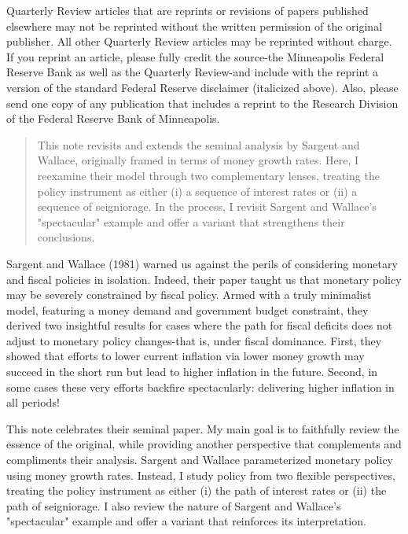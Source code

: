 \documentclass[10pt]{article}
\begin{document}
Quarterly Review articles that are reprints or revisions of papers published elsewhere may not be reprinted without the written permission of the original publisher. All other Quarterly Review articles may be reprinted without charge. If you reprint an article, please fully credit the source-the Minneapolis Federal Reserve Bank as well as the Quarterly Review-and include with the reprint a version of the standard Federal Reserve disclaimer (italicized above). Also, please send one copy of any publication that includes a reprint to the Research Division of the Federal Reserve Bank of Minneapolis.



\begin{abstract}
This note revisits and extends the seminal analysis by Sargent and Wallace, originally framed in terms of money growth rates. Here, I reexamine their model through two complementary lenses, treating the policy instrument as either (i) a sequence of interest rates or (ii) a sequence of seigniorage. In the process, I revisit Sargent and Wallace's "spectacular" example and offer a variant that strengthens their conclusions.
\end{abstract}

Sargent and Wallace (1981) warned us against the perils of considering monetary and fiscal policies in isolation. Indeed, their paper taught us that monetary policy may be severely constrained by fiscal policy. Armed with a truly minimalist model, featuring a money demand and government budget constraint, they derived two insightful results for cases where the path for fiscal deficits does not adjust to monetary policy changes-that is, under fiscal dominance. First, they showed that efforts to lower current inflation via lower money growth may succeed in the short run but lead to higher inflation in the future. Second, in some cases these very efforts backfire spectacularly: delivering higher inflation in all periods!

This note celebrates their seminal paper. My main goal is to faithfully review the essence of the original, while providing another perspective that complements and compliments their analysis. Sargent and Wallace parameterized monetary policy using money growth rates. Instead, I study policy from two flexible perspectives, treating the policy instrument as either (i) the path of interest rates or (ii) the path of seigniorage. I also review the nature of Sargent and Wallace's "spectacular" example and offer a variant that reinforces its interpretation.
\end{document}
